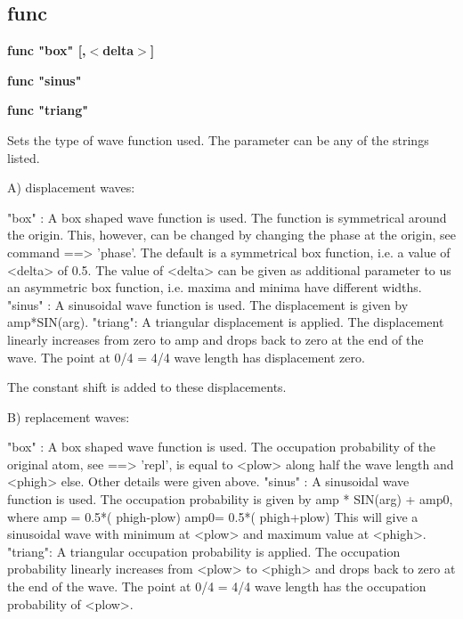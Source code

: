 \subsection*{func}
{\bf func "box" [,$ <$delta$> $] \par }
{\bf func "sinus" \par }
{\bf func "triang" \par }
\par
\vspace{3pt}
Sets the type of wave function used. The parameter can be any of the 
strings listed. 
\par
A) displacement waves: 
\par
\begin{MacVerbatim}
"box"   : A box shaped wave function is used. The function is
          symmetrical around the origin. This, however, can be
          changed by changing the phase at the origin, see command
          ==> 'phase'. The default is a symmetrical box function,
          i.e. a value of <delta> of 0.5. The value of <delta>
          can be given as additional parameter to us an asymmetric
          box function, i.e. maxima and minima have different widths.
"sinus" : A sinusoidal wave function is used. The displacement is given
          by amp*SIN(arg).
"triang": A triangular displacement is applied. The displacement linearly
          increases from zero to amp and drops back to zero at the end
          of the wave. The point at 0/4 = 4/4 wave length has displacement
          zero.
\end{MacVerbatim}
The constant shift is added to these displacements. 
\par
B) replacement waves: 
\par
\begin{MacVerbatim}
"box"   : A box shaped wave function is used. The occupation probability
          of the original atom, see ==> 'repl', is equal to <plow> along
          half the wave length and <phigh> else. Other details were
          given above.
"sinus" : A sinusoidal wave function is used. The occupation probability
          is given by
             amp * SIN(arg) + amp0, where
             amp = 0.5*( phigh-plow)
             amp0= 0.5*( phigh+plow)
          This will give a sinusoidal wave with minimum at <plow> and
          maximum value at <phigh>.
"triang": A triangular occupation probability is applied. The occupation
          probability linearly increases from <plow> to <phigh> and drops
          back to zero at the end of the wave.
          The point at 0/4 = 4/4 wave length has the occupation
          probability of <plow>.
\end{MacVerbatim}
